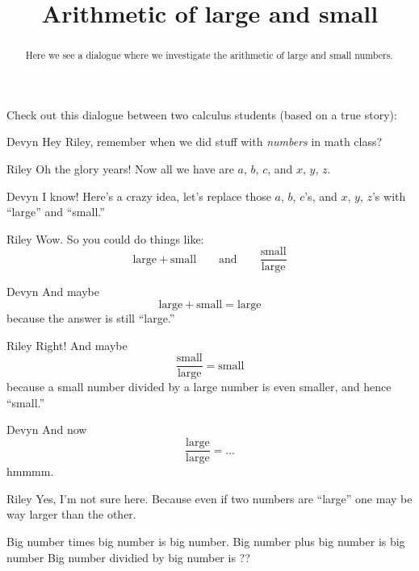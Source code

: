 \documentclass{ximera}
\title[Break-Ground:]{Arithmetic of large and small}
\begin{document}
\begin{abstract}
Here we see a dialogue where we investigate the arithmetic of large
and small numbers.
\end{abstract}
\maketitle


Check out this dialogue between two calculus students (based on a true
story):

\begin{dialogue}
\item[Devyn] Hey Riley, remember when we did stuff with
  \textit{numbers} in math class?
\item[Riley] Oh the glory years! Now all we have are $a$, $b$, $c$, and $x$, $y$, $z$.
\item[Devyn] I know! Here's a crazy idea, let's replace those $a$,
  $b$, $c$'s, and $x$, $y$, $z$'s with ``large'' and ``small.''
\item[Riley] Wow. So you could do things like:
  \[
  \text{large}+\text{small}\qquad\text{and}\qquad \frac{\text{small}}{\text{large}}
  \]
\item[Devyn] And maybe
  \[
  \text{large}+\text{small} = \text{large}
  \]
  because the answer is still ``large.''
\item[Riley] Right! And maybe
  \[
  \frac{\text{small}}{\text{large}} = \text{small}
  \]
  because a small number divided by a large number is even smaller, and hence ``small.''
\item[Devyn] And now
  \[
  \frac{\text{large}}{\text{large}} = \dots
  \]
  hmmmm.
  \item[Riley] Yes, I'm not sure here. Because even if two numbers are
    ``large'' one may be way larger than the other.
\end{dialogue}

Big number times big number is big number.
Big number plus big number is big number
Big number dividied by big number is ??
\end{document}
